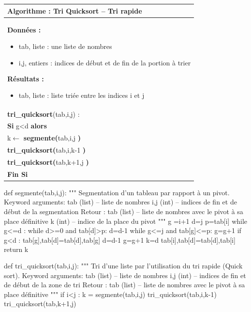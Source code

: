 \documentclass[10pt]{article}
\begin{document}
\begin{pseudo}
\begin{center}
\begin{tabular}{p{}}
\hline
\textbf{Algorithme :} Tri Quicksort -- Tri rapide\\
\hline
\textbf{Données :}
\begin{itemize}
\item \textsf{tab}, liste : une liste de nombres
\item \textsf{i,j}, entiers : indices de début et de fin de la portion à trier
\end{itemize}
\textbf{Résultats :} 
\begin{itemize}
\item \textsf{tab}, liste : liste triée entre les indices \textsf{i} et \textsf{j}
\end{itemize}
\\
\textbf{tri\_quicksort}(\textsf{tab,i,j}) :\\
\hspace{.4cm} \textbf{Si} \textsf{g<d} \textbf{alors} \\
\hspace{.8cm} \textsf{k$\leftarrow$} \textbf{segmente(}\textsf{tab,i,j} \textbf{)} \\
\hspace{.8cm} \textbf{tri\_quicksort(}\textsf{tab,i,k-1} \textbf{)} \\
\hspace{.8cm} \textbf{tri\_quicksort(}\textsf{tab,k+1,j} \textbf{)} \\
\hspace{.4cm} \textbf{Fin Si} \\
\hline
\end{tabular}
\end{center}
\end{pseudo}

\begin{py}
\begin{python}
def segmente(tab,i,j):
    """
    Segmentation d'un tableau par rapport à un pivot.
    Keyword arguments: 
    tab (list) -- liste de nombres
    i,j (int) -- indices de fin et de début de la segmentation
    Retour :    
    tab (list) -- liste de nombres avec le pivot à sa place définitive
    k (int) -- indice de la place du pivot
    """
    g =i+1
    d=j
    p=tab[i]
    while g<=d :
        while d>=0 and tab[d]>p:
            d=d-1
        while g<=j and tab[g]<=p:
            g=g+1
        if g<d :
            tab[g],tab[d]=tab[d],tab[g]
            d=d-1
            g=g+1
    k=d
    tab[i],tab[d]=tab[d],tab[i]
    return k
\end{python}

\begin{python}
def tri_quicksort(tab,i,j):
    """
    Tri d'une liste par l'utilisation du tri rapide (Quick sort).
    Keyword arguments: 
    tab (list) -- liste de nombres
    i,j (int) -- indices de fin et de début de la zone de tri
    Retour :    
    tab (list) -- liste de nombres avec le pivot à sa place définitive
    """
    if i<j :
        k = segmente(tab,i,j)
        tri_quicksort(tab,i,k-1)
        tri_quicksort(tab,k+1,j)
\end{python}
\end{py}
\end{document}
